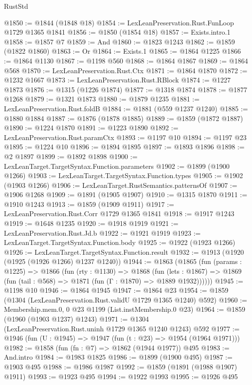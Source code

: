 \begin{lexlean}{RustStd}
\begin{coremodule}
@1850 := @1844 (@1848 @18)
@1854 := LexLeanPreservation.Rust.FunLoop @1729 @1365 @1841
@1856 := @1850 (@1854 @18)
@1857 := Exists.intro.{1}
@1858 := @1857 @7
@1859 := And
@1860 := @1823 @1243
@1862 := @1859 (@1822 @1860)
@1863 := Or
@1864 := Exists.{1}
@1865 := @1864 @1225
@1866 := @1864 @1130
@1867 := @1198 @560
@1868 := @1864 @1867
@1869 := @1864 @568
@1870 := LexLeanPreservation.Rust.Ctx
@1871 := @1864 @1870
@1872 := @1232 @1667
@1873 := LexLeanPreservation.Rust.RBlock
@1874 := @1227 @1873
@1876 := @1315 (@1226 @1874)
@1877 := @1318 @1874
@1878 := @1877 @1268
@1879 := @1321 @1873
@1880 := @1879 @1235
@1881 := LexLeanPreservation.Rust.foldB
@1884 := @1881 (@559 @1237 @1240)
@1885 := @1880 @1884
@1887 := @1876 (@1878 @1885)
@1889 := @1859 (@1872 @1887)
@1890 := @1224 @1870
@1891 := @1223 @1890
@1892 := LexLeanPreservation.Rust.paramCtx
@1893 := @1197 @10
@1894 := @1197 @23
@1895 := @1224 @10
@1896 := @1894 @1895
@1897 := @1893 @1896
@1898 := @2 @1897
@1899 := @1892 @1898
@1900 := LexLeanTarget.TargetSyntax.Function.parameters
@1902 := @1899 (@1900 @1266)
@1903 := LexLeanTarget.TargetSyntax.Function.types
@1905 := @1902 (@1903 @1266)
@1906 := LexLeanTarget.RustSemantics.patternsOf
@1907 := @1906 @1268
@1909 := @1891 (@1905 @1907)
@1910 := @1315 @1870
@1911 := @1910 @1243
@1913 := @1859 (@1909 @1911)
@1917 := LexLeanPreservation.Rust.Corr @1729 @1365 @1841
@1918 := @1917 @1243
@1919 := @1648 @1235
@1920 := @1918 @1919
@1921 := LexLeanPreservation.Rust.Jd.b
@1922 := @1921 @1919
@1923 := LexLeanTarget.TargetSyntax.Function.body
@1925 := @1922 (@1923 @1266)
@1926 := LexLeanTarget.TargetSyntax.Function.result
@1932 := @1913 (@1920 (@1925 (@1926 @1266) @1237 @1240))
@1944 := @1863
    (@1865
      (fun (params : @1225) =>
      @1866
        (fun (rty : @1130) =>
        @1868
          (fun (lets : @1867) =>
          @1869 (fun (tail : @568) => @1871 (fun (Γ : @1870) => @1889 @1932))))))
@1945 := @1198 @10
@1946 := @1864 @1945
@1947 := @1864 @23
@1954 := @1859 (@1304 (LexLeanPreservation.Rust.validU @1729 @1365 @1240) @592)
@1960 := Membership.mem.{0, 0} @23 @1199 (List.instMembership.{0} @23)
@1964 := @1859 (@1960 (@1903 @1237) @1243)
@1971 := @1304 (LexLeanPreservation.Rust.uninh @1729 @1365 @1240 @1243) @592
@1977 := @1946 (fun (U : @1945) => @1947 (fun (t : @23) => @1954 (@1964 @1971)))
@1982 := @1858 (fun (fn : @7) => @1862 (@1944 @1977)) @495
@1983 := And.intro
@1984 := @1983 @1825
@1986 := @1899 (@1900 @495)
@1987 := @1903 @495
@1988 := @1986 @1987
@1992 := @1859 (@1891 (@1988 @1907) @1911)
@1993 := @1923 @495
@1994 := @1922 @1993
@1995 := @1926 @495

\end{coremodule}
\end{lexlean}
